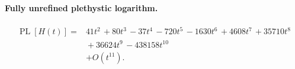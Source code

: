 \documentclass[10pt]{article}
\begin{document}
\paragraph{Fully unrefined plethystic logarithm.}
\[
\begin{aligned}
\operatorname{PL}[H(t)] ={}& 41t^{2}\,+80t^{3}\,-37t^{4}\,-720t^{5}\,-1630t^{6}\,+4608t^{7}\,+35710t^{8} \\
  &{}+36624t^{9}\,-438158t^{10} \\
  &+ O(t^{11}).
\end{aligned}
\]
\end{document}
